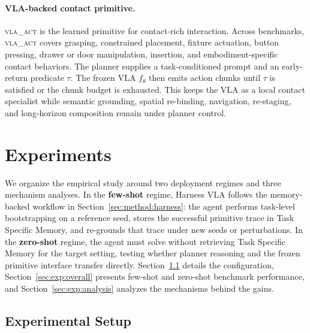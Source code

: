\documentclass{article}
\begin{document}
\paragraph{VLA-backed contact primitive.}
\textsc{vla\_act} is the learned primitive for contact-rich interaction. Across benchmarks, \textsc{vla\_act} covers grasping, constrained placement, fixture actuation, button pressing, drawer or door manipulation, insertion, and embodiment-specific contact behaviors. The planner supplies a task-conditioned prompt and an early-return predicate $\tau$. The frozen VLA $f_\theta$ then emits action chunks until $\tau$ is satisfied or the chunk budget is exhausted. This keeps the VLA as a local contact specialist while semantic grounding, spatial re-binding, navigation, re-staging, and long-horizon composition remain under planner control.



\section{Experiments}
\label{sec:result}

We organize the empirical study around two deployment regimes and three mechanism analyses. In the \textbf{few-shot} regime, Harness VLA follows the memory-backed workflow in Section~\ref{sec:method:harness}: the agent performs task-level bootstrapping on a reference seed, stores the successful primitive trace in Task Specific Memory, and re-grounds that trace under new seeds or perturbations. In the \textbf{zero-shot} regime, the agent must solve without retrieving Task Specific Memory for the target setting, testing whether planner reasoning and the frozen primitive interface transfer directly. Section~\ref{sec:exp:setup} details the configuration, Section~\ref{sec:exp:overall} presents few-shot and zero-shot benchmark performance, and Section~\ref{sec:exp:analysis} analyzes the mechanisms behind the gains.

\subsection{Experimental Setup}
\label{sec:exp:setup}
\end{document}
